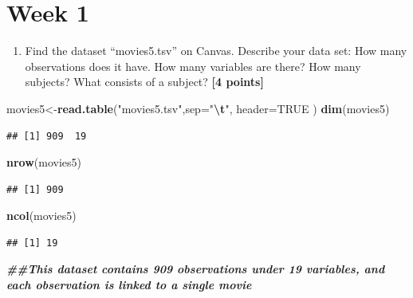 \documentclass[
]{article}
\newenvironment{Shaded}{\begin{snugshade}}{\end{snugshade}}
\newcommand{\AttributeTok}[1]{\textcolor[rgb]{0.13,0.29,0.53}{#1}}
\newcommand{\ConstantTok}[1]{\textcolor[rgb]{0.56,0.35,0.01}{#1}}
\newcommand{\DocumentationTok}[1]{\textcolor[rgb]{0.56,0.35,0.01}{\textbf{\textit{#1}}}}
\newcommand{\FunctionTok}[1]{\textcolor[rgb]{0.13,0.29,0.53}{\textbf{#1}}}
\newcommand{\NormalTok}[1]{#1}
\newcommand{\OtherTok}[1]{\textcolor[rgb]{0.56,0.35,0.01}{#1}}
\newcommand{\SpecialCharTok}[1]{\textcolor[rgb]{0.81,0.36,0.00}{\textbf{#1}}}
\newcommand{\StringTok}[1]{\textcolor[rgb]{0.31,0.60,0.02}{#1}}
\providecommand{\tightlist}{%
  \setlength{\itemsep}{0pt}\setlength{\parskip}{0pt}}
\begin{document}
\section{Week 1}\label{week-1}

\begin{enumerate}
\def\labelenumi{\arabic{enumi}.}
\tightlist
\item
  Find the dataset ``movies5.tsv'' on Canvas. Describe your data set:
  How many observations does it have. How many variables are there? How
  many subjects? What consists of a subject? \textbf{[4 points]}
\end{enumerate}

\begin{Shaded}
\begin{Highlighting}[]
\NormalTok{movies5}\OtherTok{\textless{}{-}}\FunctionTok{read.table}\NormalTok{(}\StringTok{"movies5.tsv"}\NormalTok{,}\AttributeTok{sep=}\StringTok{"}\SpecialCharTok{\textbackslash{}t}\StringTok{"}\NormalTok{, }\AttributeTok{header=}\ConstantTok{TRUE}\NormalTok{ )}
\FunctionTok{dim}\NormalTok{(movies5)}
\end{Highlighting}
\end{Shaded}

\begin{verbatim}
## [1] 909  19
\end{verbatim}

\begin{Shaded}
\begin{Highlighting}[]
\FunctionTok{nrow}\NormalTok{(movies5)}
\end{Highlighting}
\end{Shaded}

\begin{verbatim}
## [1] 909
\end{verbatim}

\begin{Shaded}
\begin{Highlighting}[]
\FunctionTok{ncol}\NormalTok{(movies5)}
\end{Highlighting}
\end{Shaded}

\begin{verbatim}
## [1] 19
\end{verbatim}

\begin{Shaded}
\begin{Highlighting}[]
\DocumentationTok{\#\#This dataset contains 909 observations under 19 variables, and each observation is linked to a single movie}
\end{Highlighting}
\end{Shaded}
\end{document}
